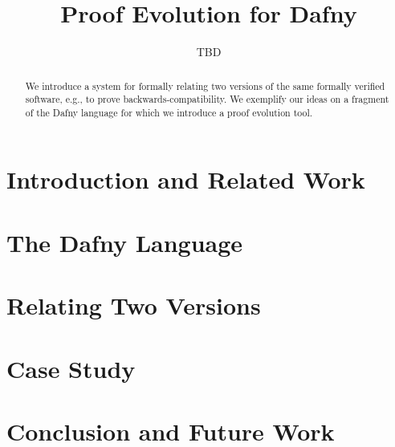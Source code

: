 \documentclass{article}
\begin{document}
\author{TBD}
\title{Proof Evolution for Dafny}

\maketitle

\begin{abstract}
We introduce a system for formally relating two versions of the same formally verified software, e.g., to prove backwards-compatibility.
We exemplify our ideas on a fragment of the Dafny language for which we introduce a proof evolution tool.
\end{abstract}

\section{Introduction and Related Work}\label{sec:intro}
 

\section{The Dafny Language}\label{sec:dafny}


\section{Relating Two Versions}\label{sec:pe}


\section{Case Study}\label{sec:example}


\section{Conclusion and Future Work}\label{sec:conclusion}
  




%
\end{document}
